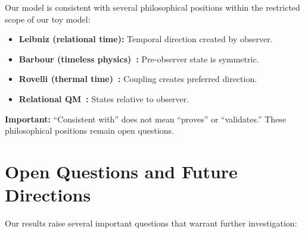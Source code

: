 \documentclass[12pt,a4paper]{article}
\begin{document}
Our model is consistent with several philosophical positions within the 
restricted scope of our toy model:

\begin{itemize}[leftmargin=*]
\item \textbf{Leibniz (relational time):} Temporal direction created by observer.
\item \textbf{Barbour (timeless physics)~\cite{barbour_1999}:} Pre-observer state is symmetric.
\item \textbf{Rovelli (thermal time)~\cite{connes_rovelli_1994, rovelli_2018}:} Coupling creates preferred direction.
\item \textbf{Relational QM~\cite{rovelli_rqm_1996}:} States relative to observer.
\end{itemize}

\textbf{Important:} ``Consistent with'' does not mean ``proves'' or 
``validates.'' These philosophical positions remain open questions.

\section{Open Questions and Future Directions}\label{sec:open_questions}

Our results raise several important questions that warrant further investigation:
\end{document}
